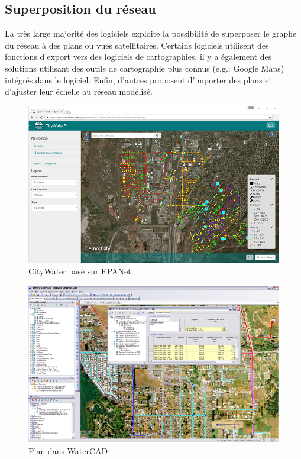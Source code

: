 \documentclass[a4paper, 11pt]{article}
\begin{document}
\newpage
\subsection{Superposition du réseau}
La très large majorité des logiciels exploite la possibilité de superposer le graphe du réseau à des plans ou vues satellitaires. Certains logiciels utilisent des fonctions d'export vers des logiciels de cartographies, il y a également des solutions utilisant des outils de cartographie plus connus (e.g.: Google Maps) intégrés dans le logiciel. Enfin, d'autres proposent d'importer des plans et d'ajuster leur échelle au réseau modélisé.

\begin{minipage}{\linewidth}
      \centering
      \begin{minipage}{0.45\linewidth}
          \begin{figure}[H]
              \includegraphics[width=\linewidth]{Etude_Comparative_1/citywater}
              \caption{CityWater basé sur EPANet}
          \end{figure}
      \end{minipage}
      \hspace{0.05\linewidth}
      \begin{minipage}{0.45\linewidth}
          \begin{figure}[H]
              \includegraphics[width=\linewidth]{Etude_Comparative_1/watergems}
              \caption{Plan dans WaterCAD}
          \end{figure}
      \end{minipage}
  \end{minipage}
\end{document}
